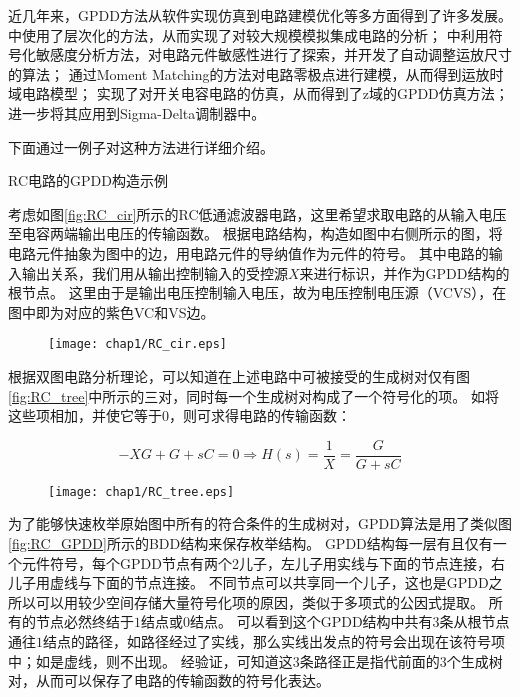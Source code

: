 近几年来，GPDD方法从软件实现仿真到电路建模优化等多方面得到了许多发展。
\parencite{XuHui-Hier-2011, LiXiaopeng-Hier-2011, SongYang-Hier-2012}中使用了层次化的方法，从而实现了对较大规模模拟集成电路的分析；
\parencite{MengXiaoxuan-Sens-2009,WengBinbin-Sens-2011,ChenJiajun-Sens-2012}中利用符号化敏感度分析方法，对电路元件敏感性进行了探索，并开发了自动调整运放尺寸的算法；
\parencite{ZhangHe-Slew-2011,ZhangAilin-Slew-2015}通过Moment Matching的方法对电路零极点进行建模，从而得到运放时域电路模型；
\parencite{ChengJiandong-SC-2013}实现了对开关电容电路的仿真，从而得到了z域的GPDD仿真方法；
\parencite{ChengJiandong-SDM-ASPDAC-2013, ChengJiandong-SDM-TENCON-2013}进一步将其应用到Sigma-Delta调制器中。

下面通过一例子对这种方法进行详细介绍。

\begin{exmp}
RC电路的GPDD构造示例
	
考虑如图\ref{fig:RC_cir}所示的RC低通滤波器电路，这里希望求取电路的从输入电压至电容两端输出电压的传输函数。
根据电路结构，构造如图中右侧所示的图，将电路元件抽象为图中的边，用电路元件的导纳值作为元件的符号。
其中电路的输入输出关系，我们用从输出控制输入的受控源$X$来进行标识，并作为GPDD结构的根节点。
这里由于是输出电压控制输入电压，故为电压控制电压源（VCVS），在图中即为对应的紫色VC和VS边。
	
\begin{figure}[!htp]
	\centering
	\texttt{[image: chap1/RC\_cir.eps]}
\end{figure}

根据双图电路分析理论\parencite{Lin-Symb}，可以知道在上述电路中可被接受的生成树对仅有图\ref{fig:RC_tree}中所示的三对，同时每一个生成树对构成了一个符号化的项。
如将这些项相加，并使它等于0，则可求得电路的传输函数：

\begin{equation}
\label{eq:RC}
- XG + G + sC = 0 \Rightarrow H\left( s \right) = \frac{1}{X} = \frac{G}{G + sC}
\end{equation}

\begin{figure}[!btp]
	\centering
	\texttt{[image: chap1/RC\_tree.eps]}
\end{figure}

为了能够快速枚举原始图中所有的符合条件的生成树对，GPDD算法是用了类似图\ref{fig:RC_GPDD}所示的BDD结构来保存枚举结构\parencite{GShi-GPDD-2013}。
GPDD结构每一层有且仅有一个元件符号，每个GPDD节点有两个2儿子，左儿子用实线与下面的节点连接，右儿子用虚线与下面的节点连接。
不同节点可以共享同一个儿子，这也是GPDD之所以可以用较少空间存储大量符号化项的原因，类似于多项式的公因式提取。
所有的节点必然终结于$1$结点或$0$结点。
可以看到这个GPDD结构中共有3条从根节点通往$1$结点的路径，如路径经过了实线，那么实线出发点的符号会出现在该符号项中；如是虚线，则不出现。
经验证，可知道这3条路径正是指代前面的3个生成树对，从而可以保存了电路的传输函数的符号化表达。


\end{exmp}
